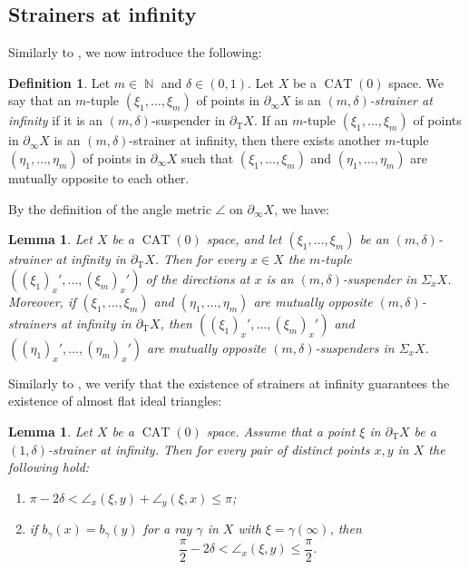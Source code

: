 \documentclass[a4paper,12pt]{amsart}
\newcommand{\CAT}{\operatorname{CAT}}
\newcommand{\N}{\operatorname{\mathbb{N}}}
\numberwithin{equation}{section}
\theoremstyle{plain}
\newtheorem{lem}[thm]{Lemma}
\theoremstyle{definition}
\newtheorem{defn}{Definition}[section]
\theoremstyle{remark}
\begin{document}
\subsection{Strainers at infinity}

Similarly to \cite[Subsection 5.2]{nagano5},
we now introduce the following:

\begin{defn}\label{defn: strinf}
Let $m \in \N$ and $\delta \in (0,1)$.
Let $X$ be a $\CAT(0)$ space.
We say that
an $m$-tuple $(\xi_1, \dots, \xi_m)$ of points in $\partial_{\infty}X$ 
is an
\emph{$(m,\delta)$-strainer at infinity}
if it is an $(m,\delta)$-suspender in $\partial_{\mathrm{T}}X$.
If an $m$-tuple $(\xi_1, \dots, \xi_m)$ of points in $\partial_{\infty}X$ 
is an $(m,\delta)$-strainer at infinity,
then there exists another 
$m$-tuple $(\eta_1, \dots, \eta_m)$ of points in $\partial_{\infty}X$
such that
$(\xi_1, \dots, \xi_m)$ and 
$(\eta_1, \dots, \eta_m)$ are mutually opposite to each other.
\end{defn}

By the definition of the angle metric $\angle$ on $\partial_{\infty}X$,
we have:

\begin{lem}\label{lem: sphstrinf}
Let $X$ be a $\CAT(0)$ space,
and let $(\xi_1, \dots, \xi_m)$ be an $(m,\delta)$-strainer at infinity
in $\partial_{\mathrm{T}}X$.
Then for every $x \in X$ the $m$-tuple
$((\xi_1)_x', \dots, (\xi_m)_x')$ of the directions at $x$
is an $(m,\delta)$-suspender in $\Sigma_xX$.
Moreover,
if $(\xi_1, \dots, \xi_m)$ and $(\eta_1, \dots, \eta_m)$ 
are mutually opposite $(m,\delta)$-strainers at infinity
in $\partial_{\mathrm{T}}X$,
then 
$\left( (\xi_1)_x', \dots, (\xi_m)_x' \right)$ and 
$\left( (\eta_1)_x', \dots, (\eta_m)_x' \right)$
are mutually opposite $(m,\delta)$-suspenders in $\Sigma_xX$.
\end{lem}

Similarly to \cite[Lemma 5.3]{nagano6},
we verify that
the existence of strainers at infinity guarantees the 
existence of almost flat ideal triangles:

\begin{lem}\label{lem: almflattri}
Let $X$ be a $\CAT(0)$ space.
Assume that
a point $\xi$ in $\partial_{\mathrm{T}}X$ be a 
$(1,\delta)$-strainer at infinity. 
Then for every pair of distinct points $x, y$ in $X$
the following hold:
\begin{enumerate}
\item
$\pi - 2\delta < \angle_x (\xi,y) + \angle_y (\xi,x) \le \pi$;
\item
if $b_{\gamma}(x) = b_{\gamma}(y)$ for a ray 
$\gamma$ in $X$ with $\xi = \gamma(\infty)$,
then 
\[
\frac{\pi}{2} - 2\delta < \angle_x (\xi,y) \le \frac{\pi}{2}.
\]
\end{enumerate}
\end{lem}
\end{document}
